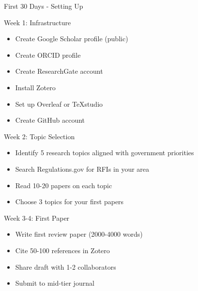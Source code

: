 \documentclass[11pt]{beamer}
\begin{document}
	\begin{frame}{First 30 Days - Setting Up}
		\scriptsize
		\begin{block}{Week 1: Infrastructure}
			\begin{itemize}
				\item Create Google Scholar profile (public)
				\item Create ORCID profile
				\item Create ResearchGate account
				\item Install Zotero
				\item Set up Overleaf or TeXstudio
				\item Create GitHub account
			\end{itemize}
		\end{block}
		\begin{block}{Week 2: Topic Selection}
			\begin{itemize}
				\item Identify 5 research topics aligned with government priorities
				\item Search Regulations.gov for RFIs in your area
				\item Read 10-20 papers on each topic
				\item Choose 3 topics for your first papers
			\end{itemize}
		\end{block}
		\begin{block}{Week 3-4: First Paper}
			\begin{itemize}
				\item Write first review paper (2000-4000 words)
				\item Cite 50-100 references in Zotero
				\item Share draft with 1-2 collaborators
				\item Submit to mid-tier journal
			\end{itemize}
		\end{block}
	\end{frame}
	
\end{document}
